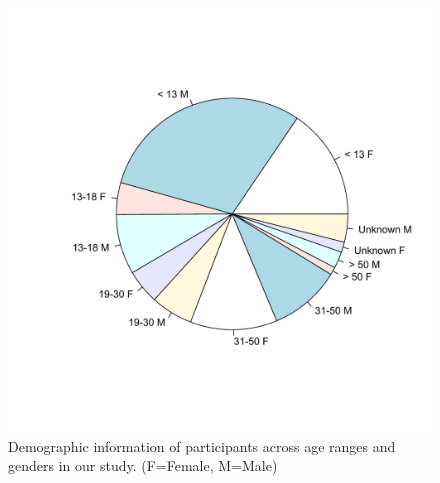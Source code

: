 \documentclass[10pt,journal,compsoc]{IEEEtran}
\begin{document}
\begin{figure}[tb]
\centering
\includegraphics[width=0.9\columnwidth,trim=10 10 10 0, clip]{AgeGenderDistribution} 
\caption{ Demographic information of participants across age ranges and genders in our study. (F=Female, M=Male)}%
\label{demographic}
\end{figure}

\end{document}
